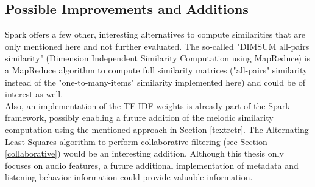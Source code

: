 \subsection{Possible Improvements and Additions}

Spark offers a few other, interesting alternatives to compute similarities that are only mentioned here and not further evaluated.  
The so-called "DIMSUM all-pairs similarity" (Dimension Independent Similarity Computation using MapReduce) is a MapReduce algorithm to compute full similarity matrices ("all-pairs" similarity instead of the "one-to-many-items" similarity implemented here) and could be of interest as well.\\
Also, an implementation of the TF-IDF weights is already part of the Spark framework, possibly enabling a future addition of the melodic similarity computation using the mentioned approach in Section \ref{textretr}.
The Alternating Least Squares algorithm to perform collaborative filtering (see Section \ref{collaborative}) would be an interesting addition. Although this thesis only focuses on audio features, a future additional implementation of metadata and listening behavior information could provide valuable information.\\ 